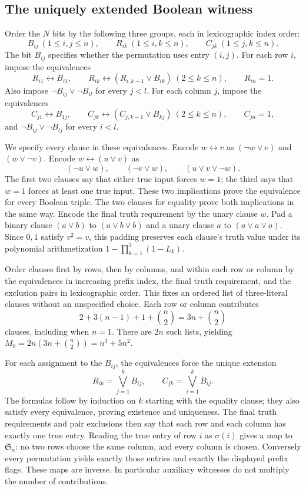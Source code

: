 \subsection{The uniquely extended Boolean witness}

Order the $N$ bits by the following three groups, each in lexicographic
index order:
\[
 B_{ij}\ (1\le i,j\le n),\qquad
 R_{ik}\ (1\le i,k\le n),\qquad
 C_{jk}\ (1\le j,k\le n).
\]
The bit $B_{ij}$ specifies whether the permutation uses entry $(i,j)$.
For each row $i$, impose the equivalences
\[
 R_{i1}\leftrightarrow B_{i1},\qquad
 R_{ik}\leftrightarrow(R_{i,k-1}\vee B_{ik})\ (2\le k\le n),
 \qquad R_{in}=1.
\]
Also impose $\neg B_{ij}\vee\neg B_{il}$ for every $j<l$.
For each column $j$, impose the equivalences
\[
 C_{j1}\leftrightarrow B_{1j},\qquad
 C_{jk}\leftrightarrow(C_{j,k-1}\vee B_{kj})\ (2\le k\le n),
 \qquad C_{jn}=1,
\]
and $\neg B_{ij}\vee\neg B_{lj}$ for every $i<l$.

We specify every clause in these equivalences. Encode $w\leftrightarrow v$
as $(\neg w\vee v)$ and $(w\vee\neg v)$. Encode
$w\leftrightarrow(u\vee v)$ as
\[
 (\neg u\vee w),\qquad(\neg v\vee w),\qquad
 (u\vee v\vee\neg w).
\]
The first two clauses say that either true input forces $w=1$;
the third says that $w=1$ forces at least one true input.
These two implications prove the equivalence for every Boolean triple.
The two clauses for equality prove both implications in the same way.
Encode the final truth requirement by the unary clause $w$.
Pad a binary clause $(a\vee b)$ to $(a\vee b\vee b)$ and a unary
clause $a$ to $(a\vee a\vee a)$. Since $0,1$ satisfy $v^2=v$, this
padding preserves each clause's truth value under its polynomial
arithmetization $1-\prod_{k=1}^3(1-L_k)$.

Order clauses first by rows, then by columns, and within each row or
column by the equivalences in increasing prefix index, the final truth
requirement, and the exclusion pairs in lexicographic order. This fixes
an ordered list of three-literal clauses without an unspecified choice.
Each row or column contributes
\[
 2+3(n-1)+1+\binom n2=3n+\binom n2
\]
clauses, including when $n=1$. There are $2n$ such lists, yielding
$M_0=2n(3n+\binom n2)=n^3+5n^2$.

For each assignment to the $B_{ij}$, the equivalences force the unique
extension
\[
 R_{ik}=\bigvee_{j=1}^k B_{ij},\qquad
 C_{jk}=\bigvee_{i=1}^k B_{ij}.
\]
The formulas follow by induction on $k$ starting with the equality clause;
they also satisfy every equivalence, proving existence and uniqueness.
The final truth requirements and pair exclusions then say that each
row and each column has exactly one true entry. Reading the true entry
of row $i$ as $\sigma(i)$ gives a map to $\mathfrak S_n$: no two rows
choose the same column, and every column is chosen. Conversely every
permutation yields exactly those entries and exactly the displayed
prefix flags. These maps are inverse. In particular auxiliary witnesses
do not multiply the number of contributions.

